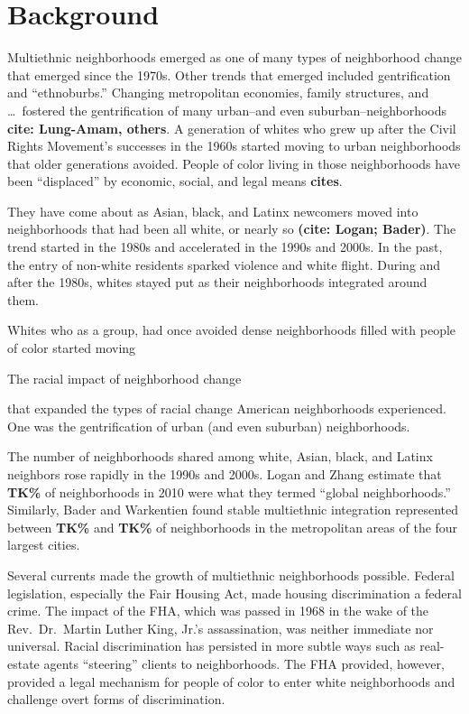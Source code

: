 \documentclass{baderart}
\begin{document}
\section{Background}\label{background}
Multiethnic neighborhoods emerged as one of many types of neighborhood change that emerged since the 1970s. Other trends that emerged included gentrification and ``ethnoburbs.'' Changing metropolitan economies, family structures, and \ldots\ fostered the gentrification of many urban--and even suburban--neighborhoods \textbf{cite: Lung-Amam, others}. A generation of whites who grew up after the Civil Rights Movement's successes in the 1960s started moving to urban neighborhoods that older generations avoided. People of color living in those neighborhoods have been ``displaced'' by economic, social, and legal means \textbf{cites}. 



They have come about as Asian, black, and Latinx newcomers moved into neighborhoods that had been all white, or nearly so \textbf{(cite: Logan; Bader)}. The trend started in the 1980s and accelerated in the 1990s and 2000s. In the past, the entry of non-white residents sparked violence and white flight. During and after the 1980s, whites stayed put as their neighborhoods integrated around them. 




Whites who as a group,  had once avoided dense neighborhoods filled with people of color started moving 

The racial impact of neighborhood change 


that expanded the types of racial change American neighborhoods experienced. One was the gentrification of urban (and even suburban) neighborhoods. 

The number of neighborhoods shared among white, Asian, black, and Latinx neighbors rose rapidly in the 1990s and 2000s. Logan and Zhang estimate that \textbf{TK\%} of neighborhoods in 2010 were what they termed ``global neighborhoods.'' Similarly, Bader and Warkentien found stable multiethnic integration represented between \textbf{TK\%} and \textbf{TK\%} of neighborhoods in the metropolitan areas of the four largest cities.

Several currents made the growth of multiethnic neighborhoods possible. Federal legislation, especially the Fair Housing Act, made housing discrimination a federal crime. The impact of the FHA, which was passed in 1968 in the wake of the Rev.~Dr.~Martin Luther King, Jr.'s assassination, was neither immediate nor universal. Racial discrimination has persisted in more subtle ways such as real-estate agents ``steering'' clients to neighborhoods. The FHA provided, however, provided a legal mechanism for people of color to enter white neighborhoods and challenge overt forms of discrimination.
\end{document}
